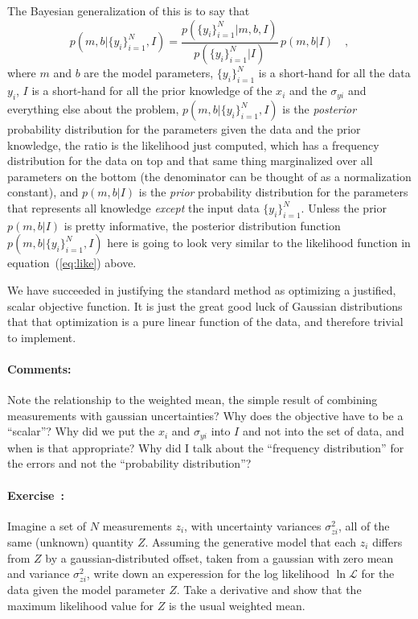\documentclass[12pt]{article}
\newcommand{\equationname}{equation}
\newcommand{\problemname}{Exercise}
\newcommand{\commentsname}{Comments}
\newcounter{problem}
\newenvironment{problem}{\paragraph{\problemname~\theproblem:}\refstepcounter{problem}}{}
\newenvironment{comments}{\paragraph{\commentsname:}}{}
\newcommand{\setofall}[3]{\{{#1}\}_{{#2}}^{{#3}}}
\newcommand{\ally}{\setofall{y_i}{i=1}{N}}
\newcommand{\like}{\mathscr{L}}
\begin{document}
The Bayesian generalization of this is to say that
\begin{equation}
p(m,b|\ally,I) = \frac{p(\ally|m,b,I)}{p(\ally|I)}\,p(m,b|I) \quad ,
\end{equation}
where $m$ and $b$ are the model parameters, $\ally$ is a short-hand for
all the data $y_i$, $I$ is a short-hand for all the prior knowledge of
the $x_i$ and the $\sigma_{yi}$ and everything else about the problem,
$p(m,b|\ally,I)$ is the \emph{posterior} probability distribution for the
parameters given the data and the prior knowledge, the ratio is the
likelihood just computed, which has a frequency distribution for the
data on top and that same thing marginalized over all parameters on
the bottom (the denominator can be thought of as a normalization
constant), and $p(m,b|I)$ is the \emph{prior} probability distribution
for the parameters that represents all knowledge \emph{except} the
input data $\ally$.  Unless the prior $p(m,b|I)$ is pretty informative,
the posterior distribution function $p(m,b|\ally,I)$ here is going to look
very similar to the likelihood function in
\equationname~(\ref{eq:like}) above.

We have succeeded in justifying the standard method as optimizing a
justified, scalar objective function.  It is just the great good luck
of Gaussian distributions that that optimization is a pure linear
function of the data, and therefore trivial to implement.

\begin{comments}
Note the relationship to the weighted mean, the simple result of
combining measurements with gaussian uncertainties?  Why does the
objective have to be a ``scalar''?  Why did we put the $x_i$ and
$\sigma_{yi}$ into $I$ and not into the set of data, and when is that
appropriate?  Why did I talk about the ``frequency distribution'' for
the errors and not the ``probability distribution''?
\end{comments}

\begin{problem}
Imagine a set of $N$ measurements $z_i$, with uncertainty variances
$\sigma_{zi}^2$, all of the same (unknown) quantity $Z$.  Assuming the
generative model that each $z_i$ differs from $Z$ by a
gaussian-distributed offset, taken from a gaussian with zero mean and
variance $\sigma_{zi}^2$, write down an experession for the log
likelihood $\ln\like$ for the data given the model parameter $Z$.
Take a derivative and show that the maximum likelihood value for $Z$
is the usual weighted mean.
\end{problem}
\end{document}
